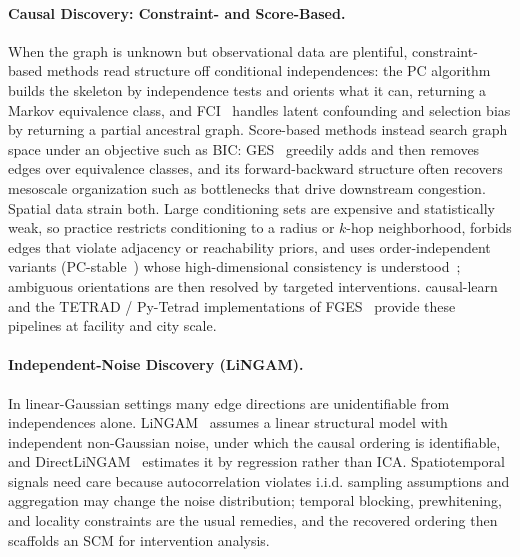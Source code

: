 \paragraph{Causal Discovery: Constraint- and Score-Based.}
When the graph is unknown but observational data are plentiful, constraint-based methods read structure off conditional independences: the PC algorithm builds the skeleton by independence tests and orients what it can, returning a Markov equivalence class, and FCI~\cite{Spirtes2000CPS} handles latent confounding and selection bias by returning a partial ancestral graph. Score-based methods instead search graph space under an objective such as BIC: GES~\cite{Chickering2002GES} greedily adds and then removes edges over equivalence classes, and its forward-backward structure often recovers mesoscale organization such as bottlenecks that drive downstream congestion. Spatial data strain both. Large conditioning sets are expensive and statistically weak, so practice restricts conditioning to a radius or $k$-hop neighborhood, forbids edges that violate adjacency or reachability priors, and uses order-independent variants (PC-stable~\cite{Colombo2014PCStable}) whose high-dimensional consistency is understood~\cite{Kalisch2007PC}; ambiguous orientations are then resolved by targeted interventions. causal-learn~\cite{zheng2024causal} and the TETRAD / Py-Tetrad implementations of FGES~\cite{Ramsey2018Tetrad,Ramsey2023PyTetrad} provide these pipelines at facility and city scale.

\paragraph{Independent-Noise Discovery (LiNGAM).}
In linear-Gaussian settings many edge directions are unidentifiable from independences alone. LiNGAM~\cite{Shimizu2006LiNGAM} assumes a linear structural model with independent non-Gaussian noise, under which the causal ordering is identifiable, and DirectLiNGAM~\cite{Shimizu2011DirectLiNGAM} estimates it by regression rather than ICA. Spatiotemporal signals need care because autocorrelation violates i.i.d. sampling assumptions and aggregation may change the noise distribution; temporal blocking, prewhitening, and locality constraints are the usual remedies, and the recovered ordering then scaffolds an SCM for intervention analysis.

